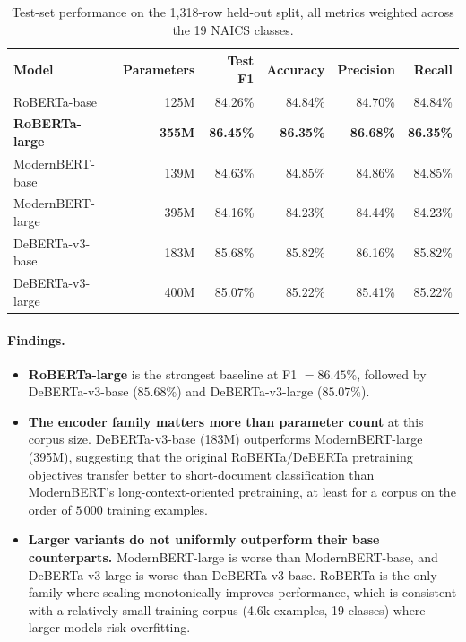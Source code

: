 \documentclass{article}
\begin{document}
\begin{table}[ht]
\centering
\caption{Test-set performance on the 1,318-row held-out split, all
metrics weighted across the 19 NAICS classes.}
\label{tab:bench}
\small
\begin{tabular}{lrrrrr}
\toprule
Model & Parameters & Test F1 & Accuracy & Precision & Recall \\
\midrule
RoBERTa-base & 125M & 84.26\% & 84.84\% & 84.70\% & 84.84\% \\
\textbf{RoBERTa-large} & \textbf{355M} & \textbf{86.45\%} & \textbf{86.35\%} & \textbf{86.68\%} & \textbf{86.35\%} \\
ModernBERT-base & 139M & 84.63\% & 84.85\% & 84.86\% & 84.85\% \\
ModernBERT-large & 395M & 84.16\% & 84.23\% & 84.44\% & 84.23\% \\
DeBERTa-v3-base & 183M & 85.68\% & 85.82\% & 86.16\% & 85.82\% \\
DeBERTa-v3-large & 400M & 85.07\% & 85.22\% & 85.41\% & 85.22\% \\
\bottomrule
\end{tabular}
\end{table}

\paragraph{Findings.}
\begin{itemize}
  \item \textbf{RoBERTa-large} is the strongest baseline at
    F1 $=86.45\%$, followed by DeBERTa-v3-base ($85.68\%$) and
    DeBERTa-v3-large ($85.07\%$).
  \item \textbf{The encoder family matters more than parameter
    count} at this corpus size. DeBERTa-v3-base (183M) outperforms
    ModernBERT-large (395M), suggesting that the original
    RoBERTa/DeBERTa pretraining objectives transfer better to
    short-document classification than ModernBERT's
    long-context-oriented pretraining, at least for a corpus on the
    order of $5\,000$ training examples.
  \item \textbf{Larger variants do not uniformly outperform their
    base counterparts.} ModernBERT-large is worse than
    ModernBERT-base, and DeBERTa-v3-large is worse than
    DeBERTa-v3-base. RoBERTa is the only family where scaling
    monotonically improves performance, which is consistent with a
    relatively small training corpus (4.6k examples, 19 classes)
    where larger models risk overfitting.
\end{itemize}
\end{document}
